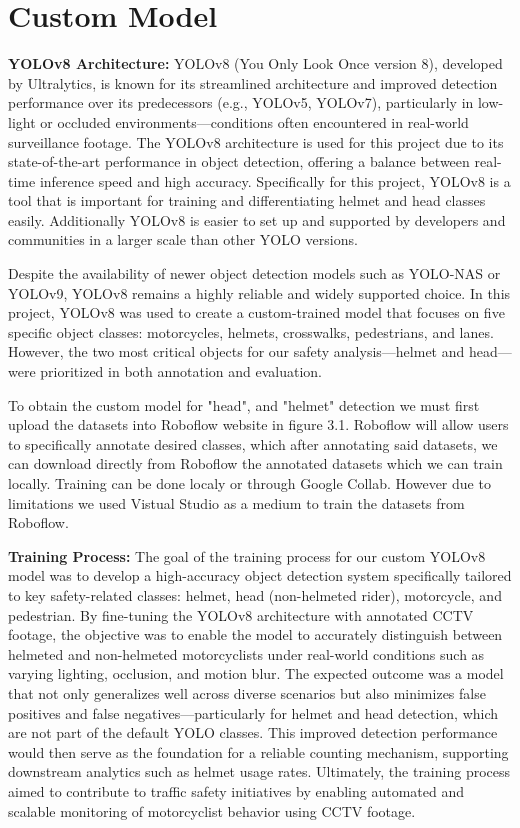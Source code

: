 \newpage
\section{Custom Model}
\textbf{YOLOv8 Architecture:}
YOLOv8 (You Only Look Once version 8), developed by Ultralytics, is known for its streamlined architecture and improved detection performance over its predecessors (e.g., YOLOv5, YOLOv7), particularly in low-light or occluded environments—conditions often encountered in real-world surveillance footage. The YOLOv8 architecture is used for this project due to its state-of-the-art performance in object detection, offering a balance between real-time inference speed and high accuracy. Specifically for this project, YOLOv8 is a tool that is important for training and differentiating helmet and head classes easily. Additionally YOLOv8 is easier to set up and supported by developers and communities in a larger scale than other YOLO versions.

Despite the availability of newer object detection models such as YOLO-NAS or YOLOv9, YOLOv8 remains a highly reliable and widely supported choice. In this project, YOLOv8 was used to create a custom-trained model that focuses on five specific object classes: motorcycles, helmets, crosswalks, pedestrians, and lanes. However, the two most critical objects for our safety analysis—helmet and head—were prioritized in both annotation and evaluation.


To obtain the custom model for "head", and "helmet" detection we must first upload the datasets into Roboflow website in figure 3.1. Roboflow will allow users to specifically annotate desired classes, which after annotating said datasets, we can download directly from Roboflow the annotated datasets which we can train locally. Training can be done localy or through Google Collab. However due to limitations we used Vistual Studio as a medium to train the datasets from Roboflow. 

\newpage

\noindent\textbf{Training Process:} The goal of the training process for our custom YOLOv8 model was to develop a high-accuracy object detection system specifically tailored to key safety-related classes: helmet, head (non-helmeted rider), motorcycle, and pedestrian. By fine-tuning the YOLOv8 architecture with annotated CCTV footage, the objective was to enable the model to accurately distinguish between helmeted and non-helmeted motorcyclists under real-world conditions such as varying lighting, occlusion, and motion blur. The expected outcome was a model that not only generalizes well across diverse scenarios but also minimizes false positives and false negatives—particularly for helmet and head detection, which are not part of the default YOLO classes. This improved detection performance would then serve as the foundation for a reliable counting mechanism, supporting downstream analytics such as helmet usage rates. Ultimately, the training process aimed to contribute to traffic safety initiatives by enabling automated and scalable monitoring of motorcyclist behavior using CCTV footage.

